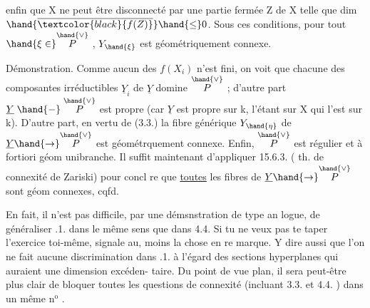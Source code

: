 enfin que X ne peut être disconnecté par une partie fermée Z de X telle
que dim $\hand{\overline{\textcolor{black}{f(Z)}}} \hand{\leq} 0$.    Sous ces conditions, pour tout $\hand{\xi \in} \overset{\hand{\vee}}{P}$ , $Y_{\hand{\xi}}$ est
géométriquement connexe.

Démonstration.  Comme  aucun des $f(X_i)$ n'est fini, on voit
que chacune des composantes irréductibles $\underline{Y}_i$ de $\underline{Y}$ domine $\overset{\hand{\vee}}{P}$ ;
d'autre part $\underline{Y} \mathrel{\hand{-}} \overset{\hand{\vee}}{P}$ est propre (car $\underline{Y}$ est propre sur k, l'étant sur X
qui l'est sur k).  D'autre part, en vertu de (3.3.) la fibre générique
$Y_{\hand{\eta}}$ de $\underline{Y} \hand{\to} \overset{\hand{\vee}}{P}$ est géométrquement connexe. Enfin, $\overset{\hand{\vee}}{P}$ est régulier et
à fortiori géom unibranche. Il suffit maintenant d'appliquer 15.6.3.
( th. de connexité  de Zariski) pour concl
re que \uline{toutes} les fibres  de $\underline{Y} \hand{\to} \overset{\hand{\vee}}{P}$ sont géom connexes, cqfd.

 En fait,  il n'est pas difficile, par une démsnstration de type an
logue, de généraliser .1. dans le même sens que dans 4.4. Si tu ne
veux pas te taper l'exercice toi-même, signale au, moins la chose en re
marque. Y dire aussi que l'on ne fait aucune discrimination dans .1.
à l'égard des sections hyperplanes qui auraient une dimension excéden-%
 taire.  Du point de vue plan, il sera peut-être plus clair de bloquer
toutes les questions de connexité (incluant 3.3. et 4.4. ) dans un
même n$^{\text{o}}$ .
